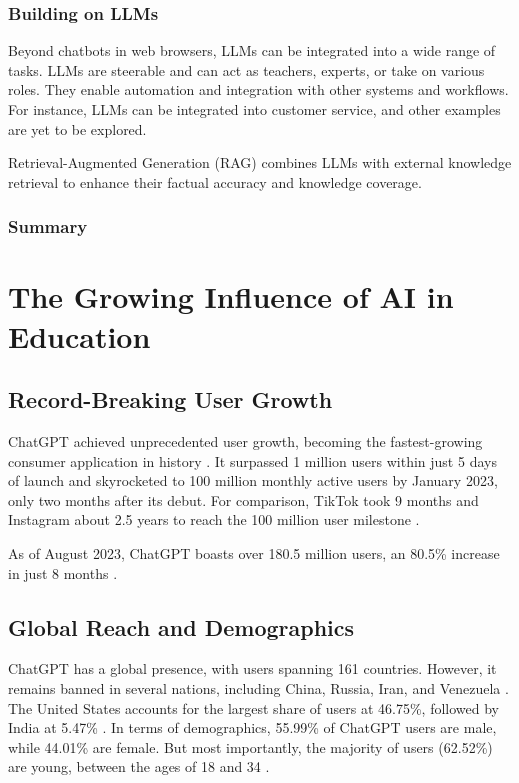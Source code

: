\documentclass{article}
\begin{document}
\subsubsection{Building on LLMs} %

Beyond chatbots in web browsers, LLMs can be integrated into a wide range of tasks. LLMs are steerable and can act as teachers, experts, or take on various roles. They enable automation and integration with other systems and workflows. For instance, LLMs can be integrated into customer service, and other examples are yet to be explored.

Retrieval-Augmented Generation (RAG) combines LLMs with external knowledge retrieval to enhance their factual accuracy and knowledge coverage.

\subsubsection{Summary}%


\newpage
\section{The Growing Influence of AI in Education}
\subsection{Record-Breaking User Growth}
ChatGPT achieved unprecedented user growth, becoming
the fastest-growing consumer application in history \cite{arstechnica_chatgpt_growth}.
It surpassed 1 million users within just 5 days of launch and skyrocketed to 100
million monthly active users by January 2023, only two months after its debut.
For comparison, TikTok took 9 months and Instagram about 2.5 years to reach the 100 million user milestone
\cite{arstechnica_chatgpt_growth}.

As of August 2023, ChatGPT boasts over 180.5 million users, an 80.5\% increase in just 8 months
\cite{meetanshi2023chatgpt} \cite{nerdynav_chatgpt_stats} \cite{namepepper_chatgpt_users}.


\subsection{Global Reach and Demographics}
ChatGPT has a global presence, with users spanning 161
countries. However, it remains banned in several nations,
including China, Russia, Iran, and Venezuela
\cite{investingchannel_chatgpt_bans}.
The United States accounts for the largest share of users
at 46.75\%, followed by India at 5.47\%
\cite{nerdynav_chatgpt_stats}.
In terms of demographics, 55.99\% of ChatGPT users
are male, while 44.01\% are female. But most importantly,
the majority of users (62.52\%) are young,
between the ages of 18 and 34 \cite{nerdynav_chatgpt_stats}.
\end{document}
